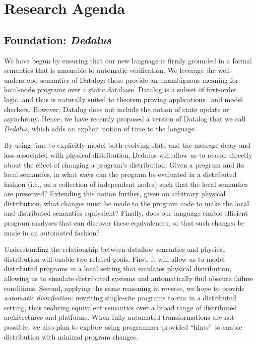 \section{Research Agenda}

\subsection{Foundation: \emph{Dedalus}}
We have begun by ensuring that our new language is
firmly grounded in a formal semantics that is amenable to automatic
verification. We leverage the well-understood semantics of Datalog:
these provide an unambiguous meaning for local-node programs over a static
database.  Datalog is a subset of first-order logic, and thus is naturally
suited to theorem proving applications~\cite{verification} and model
checkers. However, Datalog does not include the notion of state update or
asynchrony. Hence, we have recently proposed a version of Datalog that we call
\emph{Dedalus}, which adds an explicit notion of time to the
language\cite{dedalus-tr}.

By using time to explicitly model both evolving state and the message delay and loss associated with
physical distribution, Dedalus will allow us to reason directly about the effect 
of changing a program's distribution.
Given a program and its local semantics,
in what ways can the program be evaluated in a distributed fashion
(i.e., on a collection of independent nodes) such that the local
semantics are preserved?  Extending this notion further, given an
arbitrary physical distribution, what changes must be made to the
program code to make the local and distributed semantics equivalent?
Finally, does our language enable efficient program analyses that can discover these equivalences,
so that such changes be made in an automated fashion?

Understanding the relationship between dataflow semantics and
physical distribution will enable two related goals.  First, it will
allow us to model distributed programs in a local setting that
emulates physical distribution, allowing us to simulate
distributed systems and automatically find obscure failure
conditions. Second, applying the same reasoning in reverse, we hope
to provide \emph{automatic distribution}: rewriting single-site
programs to run in a distributed setting, thus realizing equivalent
semantics over a broad range of distributed architectures and
platforms.  When fully-automated transformations are not possible, we
also plan to explore using programmer-provided ``hints'' to enable
distribution with minimal program changes.

